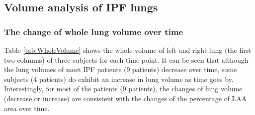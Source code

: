 \subsection{Volume analysis of IPF lungs} \label{VolumeAnalysis}
\subsubsection{The change of whole lung volume over time}
Table \ref{tab:WholeVolume} shows the whole volume of left and right lung (the first two columns) of three subjects for each time point. It can be seen that although the lung volumes of most IPF patients (9 patients) decrease over time, some subjects (4 patients) do exhibit an increase in lung volume as time goes by. Interestingly, for most of the patients (9 patients), the changes of lung volume (decrease or increase) are consistent with the changes of the percentage of LAA area over time.

